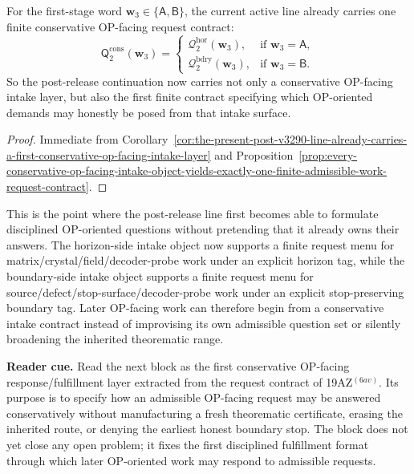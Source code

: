 \begin{corollary}
\label{cor:the-present-post-v3290-line-already-carries-a-first-finite-op-facing-request-contract}
For the first-stage word \(\mathbf w_3\in\{\mathsf A,\mathsf B\}\), the current active line already carries one finite conservative OP-facing request contract:
\[
 \mathsf{Q}^{\mathrm{cons}}_{2}(\mathbf w_3)
 =
 \begin{cases}
 \mathcal Q^{\mathrm{hor}}_{2}(\mathbf w_3), & \text{if }\mathbf w_3=\mathsf A,\\[2mm]
 \mathcal Q^{\mathrm{bdry}}_{2}(\mathbf w_3), & \text{if }\mathbf w_3=\mathsf B.
 \end{cases}
\]
So the post-release continuation now carries not only a conservative OP-facing intake layer, but also the first finite contract specifying which OP-oriented demands may honestly be posed from that intake surface.
\end{corollary}

\begin{proof}
Immediate from Corollary~\ref{cor:the-present-post-v3290-line-already-carries-a-first-conservative-op-facing-intake-layer} and Proposition~\ref{prop:every-conservative-op-facing-intake-object-yields-exactly-one-finite-admissible-work-request-contract}.
\end{proof}

\begin{remark}
\label{rem:what-the-first-conservative-op-facing-work-request-contract-now-buys}
This is the point where the post-release line first becomes able to formulate disciplined OP-oriented questions without pretending that it already owns their answers. The horizon-side intake object now supports a finite request menu for matrix/crystal/field/decoder-probe work under an explicit horizon tag, while the boundary-side intake object supports a finite request menu for source/defect/stop-surface/decoder-probe work under an explicit stop-preserving boundary tag. Later OP-facing work can therefore begin from a conservative intake contract instead of improvising its own admissible question set or silently broadening the inherited theorematic range.
\end{remark}




\noindent\textbf{Reader cue.} Read the next block as the first conservative OP-facing response/fulfillment layer extracted from the request contract of 19AZ$^{(6av)}$. Its purpose is to specify how an admissible OP-facing request may be answered conservatively without manufacturing a fresh theorematic certificate, erasing the inherited route, or denying the earliest honest boundary stop. The block does not yet close any open problem; it fixes the first disciplined fulfillment format through which later OP-oriented work may respond to admissible requests.

